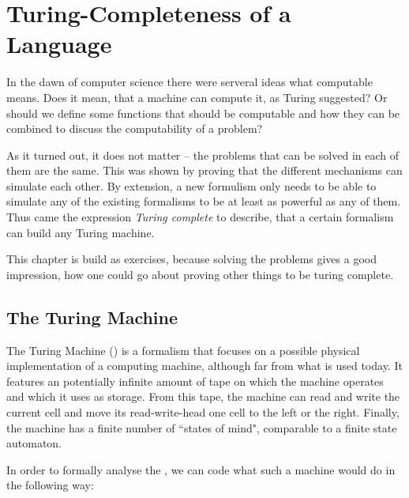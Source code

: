 \section{Turing-Completeness of a Language}
\label{sec:Turing Completeness}
In the dawn of computer science there were serveral ideas what computable 
means. Does it mean, that a machine can compute it, as Turing suggested? Or 
should we define some functions that should be computable and how they can be
combined to discuss the computability of a problem?

As it turned out, it does not matter -- the problems that can be solved in 
each of them are the same. This was shown by proving that the different 
mechanisms can simulate each other. By extension, a new formulism only needs 
to be able to simulate any of the existing formalisms to be at least as 
powerful as any of them. Thus came the expression \emph{Turing complete} to 
describe, that a certain formalism can build any Turing machine.

This chapter is build as exercises, because solving the problems gives a good 
impression, how one could go about proving other things to be turing complete.

\subsection{The Turing Machine}
The Turing Machine (\TM) is a formalism that focuses on a possible physical 
implementation of a computing machine, although far from what is used today. 
It features an potentially infinite amount of tape on which the machine 
operates and which it uses as storage. From this tape, the machine can read and
write the current cell and move its read-write-head one cell to the left or the
right. Finally, the machine has a finite number of ``states of mind",
comparable to a finite state automaton.

In order to formally analyse the \TM, we can code what such a machine would 
do in the following way:

